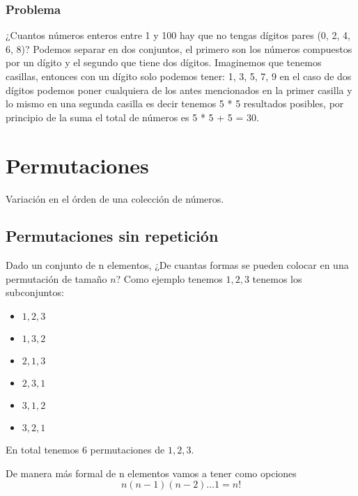 \subsubsection{Problema}
¿Cuantos números enteros entre 1 y 100 hay que no tengas dígitos pares (0, 2, 4, 6, 8)? \newline
Podemos separar en dos conjuntos, el primero son los números compuestos por un dígito y el segundo que tiene dos dígitos. Imaginemos que tenemos casillas, entonces con un dígito solo podemos tener: 1, 3, 5, 7, 9 en el caso de dos dígitos podemos poner cualquiera de los antes mencionados en la primer casilla y lo mismo en una segunda casilla es decir tenemos 5 * 5 resultados posibles, por principio de la suma el total de números es 5 * 5 + 5 = 30.

\section{Permutaciones}
Variación en el órden de una colección de números.
\subsection{Permutaciones sin repetición}
Dado un conjunto de n elementos, ¿De cuantas formas se pueden colocar en una permutación de tamaño $n$? \newline
Como ejemplo tenemos ${1, 2, 3}$ tenemos los subconjuntos:
\begin{itemize}
    \item ${1, 2, 3}$
    \item ${1, 3, 2}$
    \item ${2, 1, 3}$
    \item ${2, 3, 1}$
    \item ${3, 1, 2}$ 
    \item ${3, 2, 1}$
\end{itemize}

En total tenemos 6 permutaciones de ${1, 2, 3}$.\newline

De manera más formal de n elementos vamos a tener como opciones 
\[
    n(n - 1)(n - 2) \dots 1 = n!    
\]

